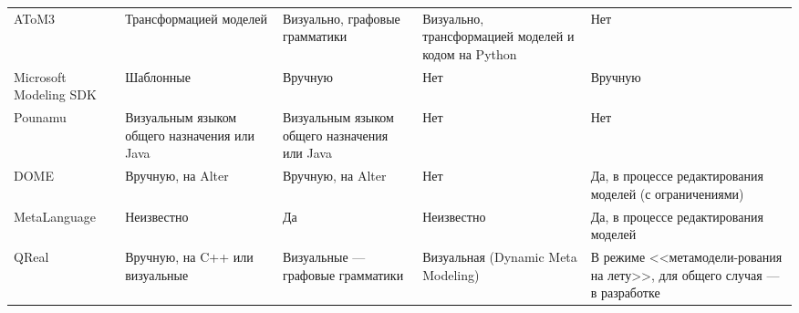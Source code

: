 \begin{table}[ht]
\begin{small}
\begin{longtabu} {| X[1 l p] | X[1 l p] | X[1 l p] | X[1 l p] | X[1 l p] |}
		AToM3                        & Трансформацией моделей                        & Визуально, графовые грамматики                 & Визуально, трансформацией моделей и кодом на Python & Нет                                                                        \\
		Microsoft Modeling SDK       & Шаблонные                                     & Вручную                                        & Нет                                                 & Вручную                                                                    \\
		Pounamu                      & Визуальным языком общего назначения или Java  & Визуальным языком общего назначения или Java   & Нет                                                 & Нет                                                                        \\
		DOME                         & Вручную, на Alter                             & Вручную, на Alter                              & Нет                                                 & Да, в процессе редактирования моделей (с ограничениями)                    \\
		MetaLanguage                 & Неизвестно                                    & Да                                             & Неизвестно                                          & Да, в процессе редактирования моделей                                      \\
		 QReal  & Вручную, на C++ или визуальные                & Визуальные --- графовые грамматики             & Визуальная (Dynamic Meta Modeling)                  & В режиме <<метамодели-рования на лету>>, для общего случая --- в разработке
		\label{tab:existingPlatformsAdditional}
	\end{longtabu}
\end{small}
\end{table}

